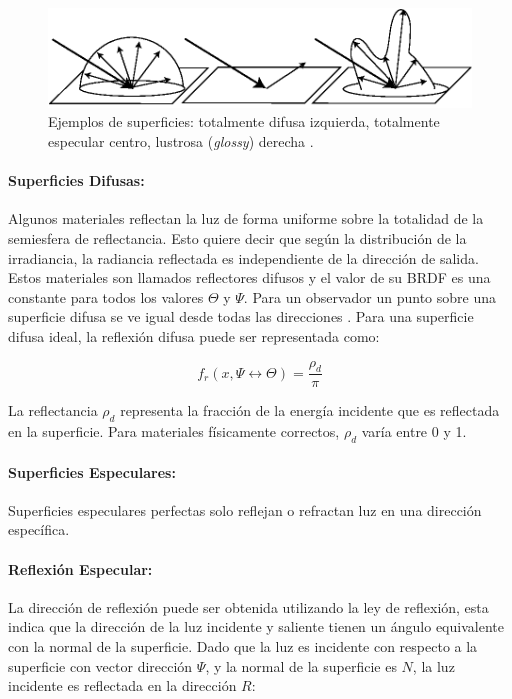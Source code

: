 \begin{figure}[H]
	\centering
	\includegraphics[width=0.85\linewidth]{media/brdfs_types.eps}
	\caption{Ejemplos de superficies: totalmente difusa izquierda, totalmente especular centro, lustrosa (\emph{glossy}) derecha \cite{advanced_gi2006}.}
	\label{fig:brdf_types}
\end{figure}

\paragraph{Superficies Difusas:}
Algunos materiales reflectan la luz de forma uniforme sobre la totalidad de la semiesfera de reflectancia. Esto quiere decir que según la distribución de la irradiancia, la radiancia reflectada es independiente de la dirección de salida. Estos materiales son llamados reflectores difusos y el valor de su \ac{BRDF} es una constante para todos los valores $\Theta$ y $\Psi$. Para un observador un punto sobre una superficie difusa se ve igual desde todas las direcciones \cite{advanced_gi2006}. Para una superficie difusa ideal, la reflexión difusa puede ser representada como:

\begin{equation}
    f_{r}(x, \Psi\leftrightarrow\Theta) = \frac{\rho_{d}}{\pi}
    \label{eq:diffuse_reflection}
\end{equation}

La reflectancia $\rho_{d}$ representa la fracción de la energía incidente que es reflectada en la superficie. Para materiales físicamente correctos, $\rho_{d}$ varía entre 0 y 1.

\paragraph{Superficies Especulares:}
\label{para:speculars}
Superficies especulares perfectas solo reflejan o refractan luz en una dirección específica.
\paragraph{Reflexión Especular:}
La dirección de reflexión puede ser obtenida utilizando la ley de reflexión, esta indica que la dirección de la luz incidente y saliente tienen un ángulo equivalente con la normal de la superficie. Dado que la luz es incidente con respecto a la superficie con vector dirección $\Psi$, y la normal de la superficie es $N$, la luz incidente es reflectada en la dirección $R$:

